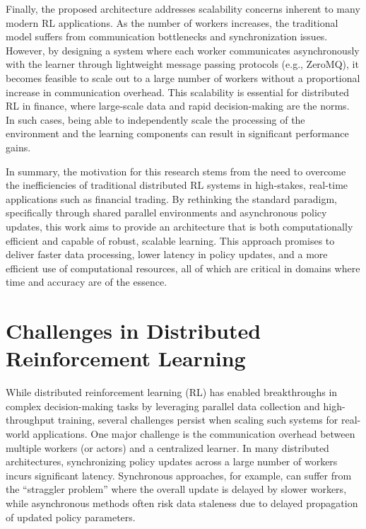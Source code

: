 Finally, the proposed architecture addresses scalability concerns inherent to many modern RL applications.
As the number of workers increases, the traditional model suffers from communication bottlenecks and synchronization issues.
However, by designing a system where each worker communicates asynchronously with the learner through lightweight message passing protocols (e.g., ZeroMQ),
it becomes feasible to scale out to a large number of workers without a proportional increase in communication overhead.
This scalability is essential for distributed RL in finance, where large-scale data and rapid decision-making are the norms.
In such cases, being able to independently scale the processing of the environment and the learning components can result in significant performance gains.


In summary, the motivation for this research stems from the need to overcome the inefficiencies of
traditional distributed RL systems in high-stakes, real-time applications such as financial trading.
By rethinking the standard paradigm, specifically through shared parallel environments and asynchronous policy
updates, this work aims to provide an architecture that is both computationally efficient and capable of robust, scalable learning.
This approach promises to deliver faster data processing, lower latency in policy updates, and a more efficient use of computational resources,
all of which are critical in domains where time and accuracy are of the essence.

\section{Challenges in Distributed Reinforcement Learning}
\label{sec:challenges}

While distributed reinforcement learning (RL) has enabled breakthroughs in complex decision-making tasks by
leveraging parallel data collection and high-throughput training,
several challenges persist when scaling such systems for real-world applications.
One major challenge is the communication overhead between multiple workers (or actors) and a centralized learner.
In many distributed architectures, synchronizing policy updates across a large number of workers incurs significant latency.
Synchronous approaches, for example, can suffer from the ``straggler problem'' where the overall update is delayed by slower workers,
while asynchronous methods often risk data staleness due to delayed propagation of updated policy parameters.



